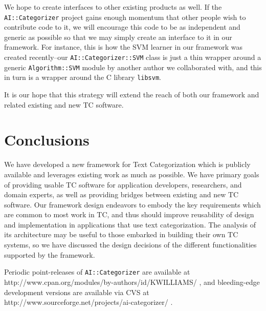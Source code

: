 \documentclass[twocolumn]{article}
\begin{document}
We hope to create interfaces to other existing products as well.  If the
\texttt{AI::Categorizer} project gains enough momentum that other
people wish to contribute code to it, we will encourage this code to
be as independent and generic as possible so that we may simply
create an interface to it in our framework.  For instance, this is 
how the SVM learner in our framework was created recently--our
\texttt{AI::Categorizer::SVM} class is just a thin wrapper around a
generic \texttt{Algorithm::SVM} module by another author we
collaborated with, and this in turn is a wrapper around the C library
\texttt{libsvm}.

It is our hope that this strategy will extend the reach of both our
framework and related existing and new TC software.


\section{Conclusions}

We have developed a new framework for Text Categorization which is
publicly available and leverages existing work as much as possible.
We have primary goals of providing usable TC software for application
developers, researchers, and domain experts, as well as providing
bridges between existing and new TC software.  Our framework design
endeavors to embody the key requirements which are common to most work
in TC, and thus should improve reusability of design and
implementation in applications that use text categorization.  The
analysis of its architecture may be useful to those embarked in building
their own TC systems, so we have discussed the design decisions of the
different functionalities supported by the framework.

Periodic point-releases of \texttt{AI::Categorizer} are available at
http://www.cpan.org/modules/by-authors/id/KWILLIAMS/ , and
bleeding-edge development versions are available via CVS at
http://www.sourceforge.net/projects/ai-categorizer/ .




\end{document}
